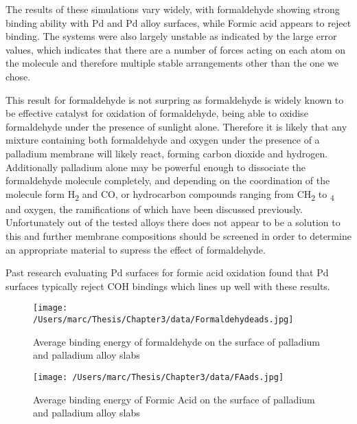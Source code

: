 The results of these simulations vary widely, with formaldehyde showing strong binding ability with Pd and Pd alloy surfaces, while Formic acid appears to reject binding. The systems were also largely unstable as indicated by the large error values, which indicates that there are a number of forces acting on each atom on the molecule and therefore multiple stable arrangements other than the one we chose.

This result for formaldehyde is not surpring as formaldehyde is widely known to be effective catalyst for oxidation of formaldehyde, being able to oxidise formaldehyde under the presence of sunlight alone. \cite{C6CY00062B} Therefore it is likely that any mixture containing both formaldehyde and oxygen under the presence of a palladium membrane will likely react, forming carbon dioxide and hydrogen. Additionally palladium alone may be powerful enough to dissociate the formaldehyde molecule completely, and depending on the coordination of the molecule form H\textsubscript{2} and CO, or hydrocarbon compounds ranging from CH\textsubscript{2} to \textsubscript{4} and oxygen,\cite{C8RA04983A} the ramifications of which have been discussed previously. Unfortunately out of the tested alloys there does not appear to be a solution to this and further membrane compositions should be screened in order to determine an appropriate material to supress the effect of formaldehyde.

Past research evaluating Pd surfaces for formic acid oxidation found that Pd surfaces typically reject COH bindings which lines up well with these results. \cite{CAPON1973239}




\begin{landscape}
  \begin{figure}
      \centering
      \texttt{[image: /Users/marc/Thesis/Chapter3/data/Formaldehydeads.jpg]}
      \caption{Average binding energy of formaldehyde on the surface of palladium and palladium alloy slabs}
      \label{formaldehydeads}
    \end{figure}
  
  \end{landscape}

\begin{landscape}
  \begin{figure}
      \centering
      \texttt{[image: /Users/marc/Thesis/Chapter3/data/FAads.jpg]}
      \caption{Average binding energy of Formic Acid on the surface of palladium and palladium alloy slabs}
      \label{FAads}
    \end{figure}
  
  \end{landscape}
